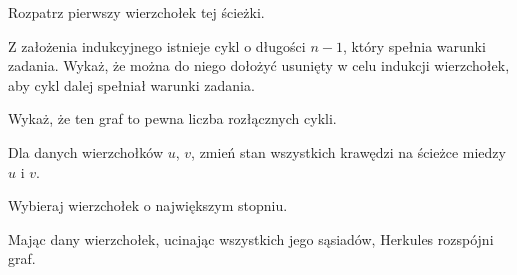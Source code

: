
\begin{hints_list}
	\item Rozpatrz pierwszy wierzchołek tej ścieżki.
	\item Z założenia indukcyjnego istnieje cykl o długości $n - 1$, który spełnia warunki zadania. Wykaż, że można do niego dołożyć usunięty w celu indukcji wierzchołek, aby cykl dalej spełniał warunki zadania.
	\item Wykaż, że ten graf to pewna liczba rozłącznych cykli.
	\item Dla danych wierzchołków $u$, $v$, zmień stan wszystkich krawędzi na ścieżce miedzy $u$ i $v$.
	\item Wybieraj wierzchołek o największym stopniu.
	\item Mając dany wierzchołek, ucinając wszystkich jego sąsiadów, Herkules rozspójni graf.
\end{hints_list}